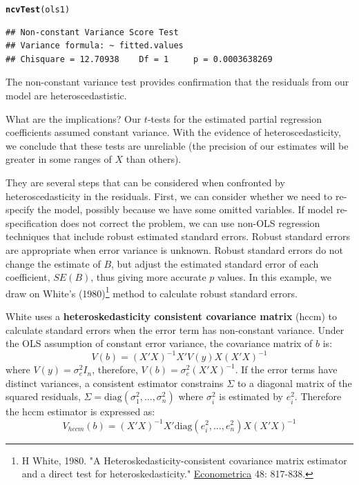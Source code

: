 \documentclass[11pt,openany]{book}\usepackage[]{graphicx}\usepackage[]{color}
\makeatletter
\newcommand{\hlstd}[1]{\textcolor[rgb]{0.345,0.345,0.345}{#1}}%
\newcommand{\hlkwd}[1]{\textcolor[rgb]{0.737,0.353,0.396}{\textbf{#1}}}%
\newenvironment{kframe}{%
 \def\at@end@of@kframe{}%
 \ifinner\ifhmode%
  \def\at@end@of@kframe{\end{minipage}}%
  \begin{minipage}{\columnwidth}%
 \fi\fi%
 \def\FrameCommand##1{\hskip\@totalleftmargin \hskip-\fboxsep
 \colorbox{shadecolor}{##1}\hskip-\fboxsep
     \hskip-\linewidth \hskip-\@totalleftmargin \hskip\columnwidth}%
 \MakeFramed {\advance\hsize-\width
   \@totalleftmargin\z@ \linewidth\hsize
   \@setminipage}}%
 {\par\unskip\endMakeFramed%
 \at@end@of@kframe}
\newenvironment{knitrout}{}{} %
\renewenvironment{knitrout}{\begin{singlespace}}{\end{singlespace}} %
\makeatother
\begin{document}
\begin{knitrout}
\color{fgcolor}\begin{kframe}
\begin{alltt}
\hlkwd{ncvTest}\hlstd{(ols1)}
\end{alltt}
\begin{verbatim}
## Non-constant Variance Score Test 
## Variance formula: ~ fitted.values 
## Chisquare = 12.70938    Df = 1     p = 0.0003638269
\end{verbatim}
\end{kframe}
\end{knitrout}
\noindent The non-constant variance test provides confirmation that the residuals from our model are heteroscedastistic.

What are the implications? Our $t$-tests for the estimated partial regression  coefficients assumed constant variance. With the evidence of heteroscedasticity, we conclude that these tests are unreliable (the precision of our estimates will be greater in some ranges of $X$ than others). 

They are several steps that can be considered when confronted by heteroscedasticity in the residuals. First, we can consider whether we need to re-specify the model, possibly because we have some omitted variables. If model re-specification does not correct the problem, we can use non-OLS regression techniques that include robust estimated  standard errors.  Robust standard errors are appropriate when error variance is unknown. Robust standard errors do not change the estimate of $B$, but adjust the estimated standard error of each coefficient, $SE(B)$, thus giving more accurate $p$ values. In this example, we draw on White's (1980)\footnote{H White,  1980.  "A Heteroskedasticity-consistent covariance matrix estimator and a direct test for heteroskedasticity." \underline{Econometrica} 48: 817-838.} method to calculate robust standard errors.  

White uses a \textbf{heteroskedasticity consistent covariance matrix} (hccm) to calculate standard errors when the error term has non-constant variance. Under the OLS assumption of constant error variance, the covariance matrix of $b$ is:
\begin{equation*}
  V(b) = (X'X)^{-1} X'V(y)X(X'X)^{-1}
\end{equation*}
\noindent where $V(y)=\sigma^{2}_{e}I_n$, therefore,
$V(b)=\sigma^{2}_{e}(X'X)^{-1}$. If the error terms have distinct
variances, a consistent estimator constrains $\Sigma$ to a diagonal
matrix of the squared residuals,
$\Sigma=\text{diag}(\sigma^2_1,\ldots,\sigma^2_n)$ where $\sigma^2_i$
is estimated by $e^2_i$. Therefore the hccm estimator is expressed as:  
\begin{equation*}
 V_{hccm}(b) = (X'X)^{-1} X'\text{diag}(e^2_i,\ldots,e^2_n) X(X'X)^{-1} 
\end{equation*}
\end{document}
